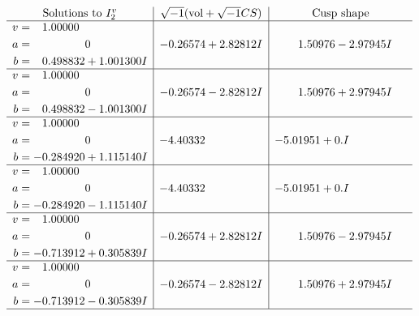\documentclass[1p]{elsarticle_modified}
\theoremstyle{definition}
\newcommand{\I}{\sqrt{-1}}
\begin{document}
$$\begin{array}{c|c|c}  
\text{Solutions to }I^v_{2}& \I (\text{vol} + \sqrt{-1}CS) & \text{Cusp shape}\\
 \hline 
\begin{aligned}
v &= \phantom{-}1.00000\phantom{ +0.000000I} \\
a &= \phantom{-0.000000 } 0 \\
b &= \phantom{-}0.498832 + 1.001300 I\end{aligned}
 & -0.26574 + 2.82812 I & \phantom{-}1.50976 - 2.97945 I \\ \hline\begin{aligned}
v &= \phantom{-}1.00000\phantom{ +0.000000I} \\
a &= \phantom{-0.000000 } 0 \\
b &= \phantom{-}0.498832 - 1.001300 I\end{aligned}
 & -0.26574 - 2.82812 I & \phantom{-}1.50976 + 2.97945 I \\ \hline\begin{aligned}
v &= \phantom{-}1.00000\phantom{ +0.000000I} \\
a &= \phantom{-0.000000 } 0 \\
b &= -0.284920 + 1.115140 I\end{aligned}
 & -4.40332\phantom{ +0.000000I} & -5.01951 + 0. I\phantom{ +0.000000I} \\ \hline\begin{aligned}
v &= \phantom{-}1.00000\phantom{ +0.000000I} \\
a &= \phantom{-0.000000 } 0 \\
b &= -0.284920 - 1.115140 I\end{aligned}
 & -4.40332\phantom{ +0.000000I} & -5.01951 + 0. I\phantom{ +0.000000I} \\ \hline\begin{aligned}
v &= \phantom{-}1.00000\phantom{ +0.000000I} \\
a &= \phantom{-0.000000 } 0 \\
b &= -0.713912 + 0.305839 I\end{aligned}
 & -0.26574 + 2.82812 I & \phantom{-}1.50976 - 2.97945 I \\ \hline\begin{aligned}
v &= \phantom{-}1.00000\phantom{ +0.000000I} \\
a &= \phantom{-0.000000 } 0 \\
b &= -0.713912 - 0.305839 I\end{aligned}
 & -0.26574 - 2.82812 I & \phantom{-}1.50976 + 2.97945 I\\
 \hline 
 \end{array}$$\newpage
\end{document}
